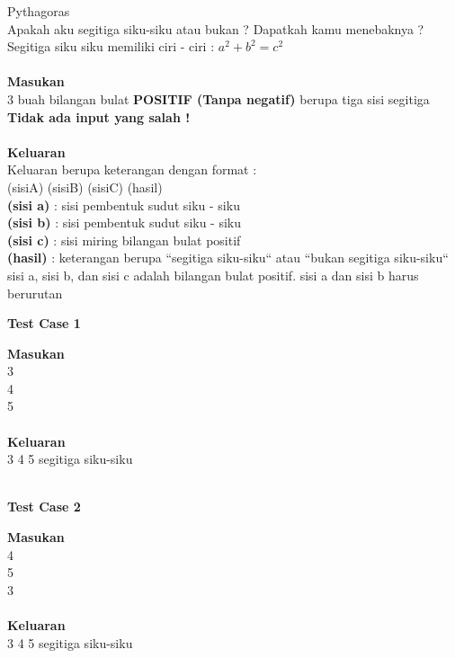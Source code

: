 \newpage
\begin{permasalahan}{Pythagoras}\\
\label{prob:pythagoras}
Apakah aku segitiga siku-siku atau bukan ? Dapatkah kamu menebaknya ? \\ 
Segitiga siku siku memiliki ciri - ciri : \begin{math}a^{2} + b^{2} = c^{2}\end{math}\\\\
	\textbf{Masukan}\\
	3 buah bilangan bulat \textbf{POSITIF (Tanpa negatif)} berupa tiga sisi segitiga\\
	\textbf{Tidak ada input yang salah !}\\\\
	\textbf{Keluaran}\\
	Keluaran berupa keterangan dengan format :\\
	(sisiA) (sisiB) (sisiC) (hasil)\\	
	\textbf{(sisi a)} : sisi pembentuk sudut siku - siku\\	
	\textbf{(sisi b)} : sisi pembentuk sudut siku - siku\\	
	\textbf{(sisi c)} : sisi miring bilangan bulat positif \\	
	\textbf{(hasil)} : keterangan berupa ``segitiga siku-siku`` atau ``bukan segitiga siku-siku``\\

	sisi a, sisi b, dan sisi c adalah bilangan bulat positif. 
	sisi a dan sisi b harus berurutan

	\begin{center}
	\textbf{Test Case 1}\\
	\end{center}
	\textbf{Masukan}\\
	3 \\
	4 \\
	5 \\\\
	\textbf{Keluaran}\\
	3 4 5 segitiga siku-siku \\\\
	
	\begin{center}
	\textbf{Test Case 2}\\
	\end{center}
	\textbf{Masukan}\\
	4 \\
	5 \\
	3 \\\\
	\textbf{Keluaran}\\
	3 4 5 segitiga siku-siku \\\\


\end{permasalahan}
